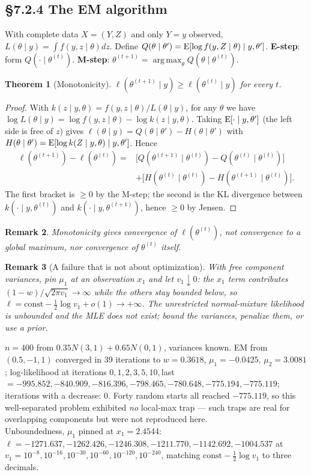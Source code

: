 \documentclass[11pt]{article}
\newtheorem{theorem}{Theorem}[section]
\newtheorem{remark}[theorem]{Remark}
\DeclareMathOperator*{\argmax}{arg\,max}
\begin{document}
\subsection{\S7.2.4 The EM algorithm}
With complete data $X=(Y,Z)$ and only $Y=y$ observed, $L(\theta\mid y)=\int f(y,z\mid\theta)dz$. Define $Q(\theta\mid\theta')=\operatorname{E}[\log f(y,Z\mid\theta)\mid y,\theta']$. \textbf{E-step}: form $Q(\cdot\mid\theta^{(t)})$. \textbf{M-step}: $\theta^{(t+1)}=\argmax_\theta Q(\theta\mid\theta^{(t)})$.
\begin{theorem}[Monotonicity]
$\ell(\theta^{(t+1)}\mid y)\ge\ell(\theta^{(t)}\mid y)$ for every $t$.
\end{theorem}
\begin{proof}
With $k(z\mid y,\theta)=f(y,z\mid\theta)/L(\theta\mid y)$, for any $\theta$ we have $\log L(\theta\mid y)=\log f(y,z\mid\theta)-\log k(z\mid y,\theta)$. Taking $\operatorname{E}[\cdot\mid y,\theta']$ (the left side is free of $z$) gives $\ell(\theta\mid y)=Q(\theta\mid\theta')-H(\theta\mid\theta')$ with $H(\theta\mid\theta')=\operatorname{E}[\log k(Z\mid y,\theta)\mid y,\theta']$. Hence
\begin{align*}
\ell(\theta^{(t+1)})-\ell(\theta^{(t)})=&\big[Q(\theta^{(t+1)}\mid\theta^{(t)})-Q(\theta^{(t)}\mid\theta^{(t)})\big]\\
&+\big[H(\theta^{(t)}\mid\theta^{(t)})-H(\theta^{(t+1)}\mid\theta^{(t)})\big].
\end{align*}
The first bracket is $\ge0$ by the M-step; the second is the KL divergence between $k(\cdot\mid y,\theta^{(t)})$ and $k(\cdot\mid y,\theta^{(t+1)})$, hence $\ge0$ by Jensen.
\end{proof}
\begin{remark}
Monotonicity gives convergence of $\ell(\theta^{(t)})$, not convergence to a global maximum, nor convergence of $\theta^{(t)}$ itself.
\end{remark}
\begin{remark}[A failure that is not about optimization]
With free component variances, pin $\mu_1$ at an observation $x_1$ and let $v_1\downarrow0$: the $x_1$ term contributes $(1-w)/\sqrt{2\pi v_1}\to\infty$ while the others stay bounded below, so $\ell=\text{const}-\frac12\log v_1+o(1)\to+\infty$. The unrestricted normal-mixture likelihood is unbounded and the MLE does not exist; bound the variances, penalize them, or use a prior.
\end{remark}
\begin{simbox}
$n=400$ from $0.35N(3,1)+0.65N(0,1)$, variances known. EM from $(0.5,-1,1)$ converged in 39 iterations to $w=0.3618$, $\mu_1=-0.0425$, $\mu_2=3.0081$; log-likelihood at iterations $0,1,2,3,5,10,$last $=-995.852,-840.909,-816.396,-798.465,-780.648,-775.194,-775.119$; iterations with a decrease: $0$. Forty random starts all reached $-775.119$, so this well-separated problem exhibited \emph{no} local-max trap --- such traps are real for overlapping components but were not reproduced here.\\
Unboundedness, $\mu_1$ pinned at $x_1=2.4544$: $\ell=-1271.637,-1262.426,-1246.308,-1211.770,-1142.692,-1004.537$ at $v_1=10^{-8},10^{-16},10^{-30},10^{-60},10^{-120},10^{-240}$, matching $\text{const}-\frac12\log v_1$ to three decimals.
\end{simbox}
\end{document}
